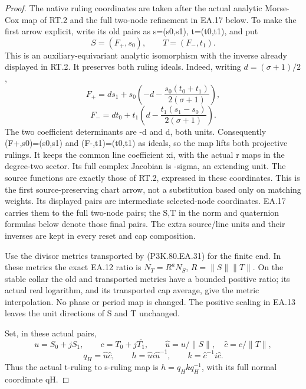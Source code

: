 \begin{proof}
The native ruling coordinates are taken after the actual analytic
Morse-Cox map of RT.2 and the full two-node refinement in EA.17 below.
To make the first arrow explicit, write its old
pairs as s=(s0,s1), t=(t0,t1), and put
\[
       S=(F_+,s_0),\qquad T=(F_-,t_1).
 \tag{P3K.80.EA.31}
\]
This is an auxiliary-equivariant analytic isomorphism with the
inverse already displayed in RT.2. It preserves both ruling
ideals. Indeed, writing \(d=(\sigma+1)/2\),
\[
 F_+=d s_1+s_0\left(-d-
                  \frac{s_0(t_0+t_1)}{2(\sigma+1)}\right),
\]
\[
 F_-=d t_0+t_1\left(d-
                  \frac{t_1(s_1-s_0)}{2(\sigma+1)}\right).
\]
The two coefficient determinants are -d and d, both units.
Consequently (F+,s0)=(s0,s1) and (F-,t1)=(t0,t1) as ideals,
so the map lifts both projective rulings. It keeps the common
line coefficient xi, with the actual r maps in the degree-two
sector. Its full complex Jacobian is -sigma, an extending unit.
The source functions are exactly those of RT.2, expressed in
these coordinates. This is the first source-preserving chart arrow,
not a substitution based only on matching weights. Its displayed
pairs are intermediate selected-node coordinates. EA.17 carries
them to the full two-node pairs; the S,T in the norm and quaternion
formulas below denote those final pairs. The extra source/line
units and their inverses are kept in every reset and cap composition.

Use the divisor metrics transported by (P3K.80.EA.31) for the finite
end. In these metrics the exact EA.12 ratio is
\(N_T=R^aN_S\), \(R=\|S\|\|T\|\). On the stable collar
the old and transported metrics have a bounded positive ratio;
its actual real logarithm, and its transported cap average, give
the metric interpolation. No phase or period map is changed.
The positive scaling in EA.13 leaves the unit directions of S
and T unchanged.

Set, in these actual pairs,
\[
 u=S_0+jS_1,\qquad c=T_0+j\overline{T_1},\qquad
 \widehat u=u/\|S\|,\quad\widehat c=c/\|T\|,
\]
\[
 q_H=\widehat u\widehat c,\qquad
 h=\widehat u i\widehat u^{-1},\qquad
 k=\widehat c^{-1}i\widehat c.
 \tag{P3K.80.EA.32}
\]
Thus the actual t-ruling to s-ruling map is
\(h=q_H k q_H^{-1}\), with its full normal coordinate qH.


\end{proof}

